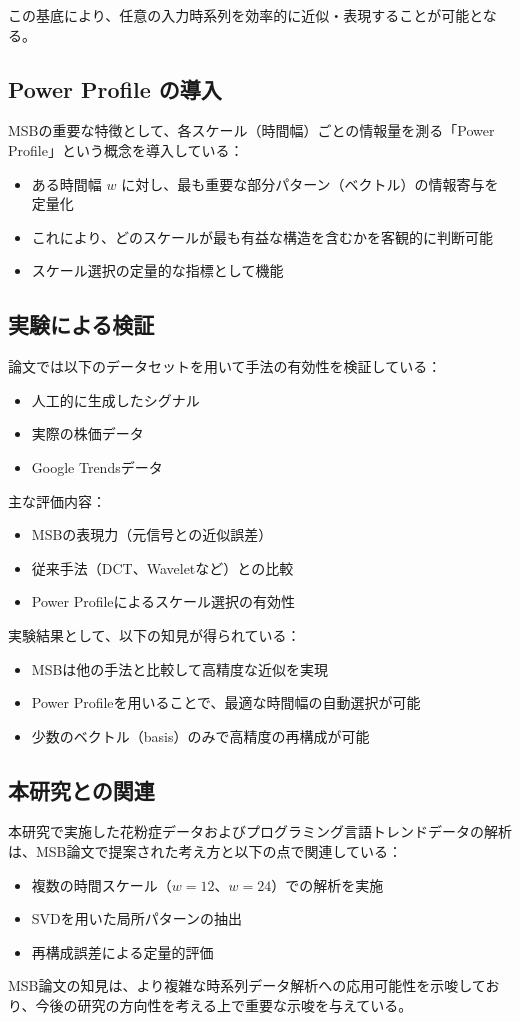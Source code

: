 \documentclass[a4paper,11pt]{jsarticle}
\begin{document}
この基底により、任意の入力時系列を効率的に近似・表現することが可能となる。

\subsection{Power Profile の導入}

MSBの重要な特徴として、各スケール（時間幅）ごとの情報量を測る「Power Profile」という概念を導入している：

\begin{itemize}
  \item ある時間幅 $w$ に対し、最も重要な部分パターン（ベクトル）の情報寄与を定量化
  \item これにより、どのスケールが最も有益な構造を含むかを客観的に判断可能
  \item スケール選択の定量的な指標として機能
\end{itemize}

\subsection{実験による検証}

論文では以下のデータセットを用いて手法の有効性を検証している：

\begin{itemize}
  \item 人工的に生成したシグナル
  \item 実際の株価データ
  \item Google Trendsデータ
\end{itemize}

主な評価内容：

\begin{itemize}
  \item MSBの表現力（元信号との近似誤差）
  \item 従来手法（DCT、Waveletなど）との比較
  \item Power Profileによるスケール選択の有効性
\end{itemize}

実験結果として、以下の知見が得られている：

\begin{itemize}
  \item MSBは他の手法と比較して高精度な近似を実現
  \item Power Profileを用いることで、最適な時間幅の自動選択が可能
  \item 少数のベクトル（basis）のみで高精度の再構成が可能
\end{itemize}

\subsection{本研究との関連}

本研究で実施した花粉症データおよびプログラミング言語トレンドデータの解析は、MSB論文で提案された考え方と以下の点で関連している：

\begin{itemize}
  \item 複数の時間スケール（$w=12$、$w=24$）での解析を実施
  \item SVDを用いた局所パターンの抽出
  \item 再構成誤差による定量的評価
\end{itemize}

MSB論文の知見は、より複雑な時系列データ解析への応用可能性を示唆しており、今後の研究の方向性を考える上で重要な示唆を与えている。
\end{document}
